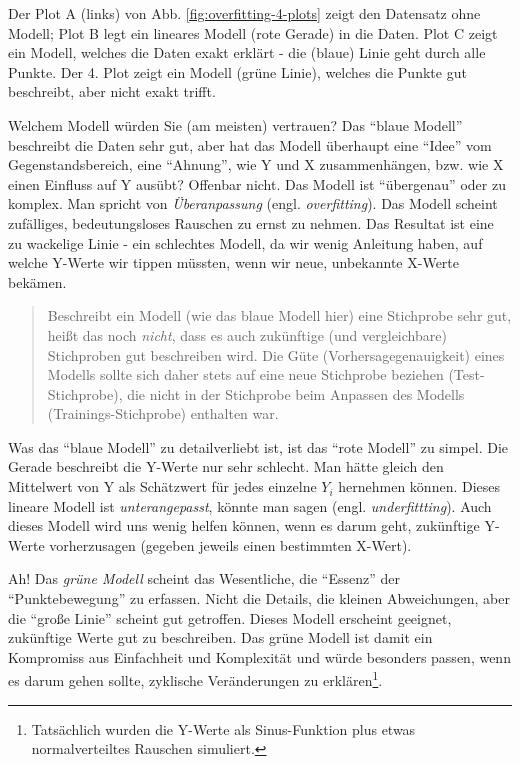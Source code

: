 \documentclass[12pt,ngerman,]{book}
\let\rmarkdownfootnote\footnote%
\def\footnote{\protect\rmarkdownfootnote}
\theoremstyle{definition}
\theoremstyle{definition}
\theoremstyle{remark}
\begin{document}
Der Plot A (links) von Abb. \ref{fig:overfitting-4-plots} zeigt den
Datensatz ohne Modell; Plot B legt ein lineares Modell (rote Gerade) in
die Daten. Plot C zeigt ein Modell, welches die Daten exakt erklärt -
die (blaue) Linie geht durch alle Punkte. Der 4. Plot zeigt ein Modell
(grüne Linie), welches die Punkte gut beschreibt, aber nicht exakt
trifft.

Welchem Modell würden Sie (am meisten) vertrauen? Das ``blaue Modell''
beschreibt die Daten sehr gut, aber hat das Modell überhaupt eine
``Idee'' vom Gegenstandsbereich, eine ``Ahnung'', wie Y und X
zusammenhängen, bzw. wie X einen Einfluss auf Y ausübt? Offenbar nicht.
Das Modell ist ``übergenau'' oder zu komplex. Man spricht von
\emph{Überanpassung} (engl.
\emph{overfitting}). Das Modell scheint zufälliges,
bedeutungsloses Rauschen zu ernst zu nehmen. Das Resultat ist eine zu
wackelige Linie - ein schlechtes Modell, da wir wenig Anleitung haben,
auf welche Y-Werte wir tippen müssten, wenn wir neue, unbekannte X-Werte
bekämen.

\begin{quote}
Beschreibt ein Modell (wie das blaue Modell hier) eine Stichprobe sehr
gut, heißt das noch \emph{nicht}, dass es auch zukünftige (und
vergleichbare) Stichproben gut beschreiben wird. Die Güte
(Vorhersagegenauigkeit) eines Modells sollte sich daher stets auf eine
neue Stichprobe beziehen (Test-Stichprobe), die nicht in der Stichprobe
beim Anpassen des Modells (Trainings-Stichprobe) enthalten war.
\end{quote}

Was das ``blaue Modell'' zu detailverliebt ist, ist das ``rote Modell''
zu simpel. Die Gerade beschreibt die Y-Werte nur sehr schlecht. Man
hätte gleich den Mittelwert von Y als Schätzwert für jedes einzelne
\(Y_i\) hernehmen können. Dieses lineare Modell ist
\emph{unterangepasst}, könnte man sagen (engl.
\emph{underfittting}). Auch dieses Modell wird uns
wenig helfen können, wenn es darum geht, zukünftige Y-Werte
vorherzusagen (gegeben jeweils einen bestimmten X-Wert).

Ah! Das \emph{grüne Modell} scheint das Wesentliche, die ``Essenz'' der
``Punktebewegung'' zu erfassen. Nicht die Details, die kleinen
Abweichungen, aber die ``große Linie'' scheint gut getroffen. Dieses
Modell erscheint geeignet, zukünftige Werte gut zu beschreiben. Das
grüne Modell ist damit ein Kompromiss aus Einfachheit und Komplexität
und würde besonders passen, wenn es darum gehen sollte, zyklische
Veränderungen zu erklären\footnote{Tatsächlich wurden die Y-Werte als
  Sinus-Funktion plus etwas normalverteiltes Rauschen simuliert.}.
\end{document}
